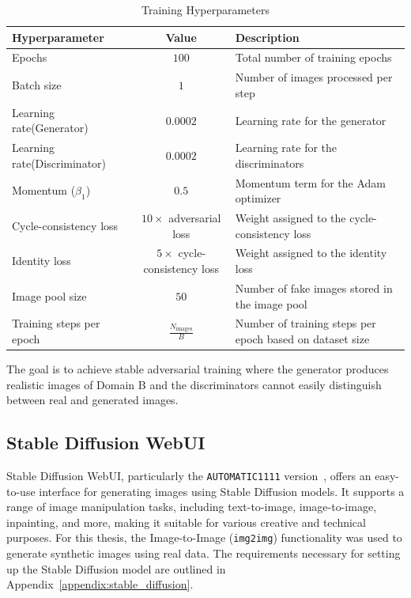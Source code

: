 \documentclass[12pt,DIV14,BCOR12mm,a4paper,footinclude=false,headinclude,parskip=half-,twoside,openright,cleardoublepage=empty,toc=index,bibliography=totoc,listof=totoc]{scrreprt}
\numberwithin{equation}{chapter}
\begin{document}
\begin{table}
    \centering
    \caption{Training Hyperparameters}
    \label{tab:hyperparameters}
    \begin{tabularx}{\textwidth}{XcX} %
        \toprule
        \textbf{Hyperparameter} & \textbf{Value} & \textbf{Description} \\ 
        \midrule
        Epochs & \( 100 \) & Total number of training epochs \\ 
        Batch size & \( 1 \) & Number of images processed per step \\
        Learning rate(Generator) & \( 0.0002 \) & Learning rate for the generator \\
        Learning rate(Discriminator) & \( 0.0002 \) & Learning rate for the discriminators \\
        Momentum (\( \beta_1 \)) & \( 0.5 \) & Momentum term for the Adam optimizer \\
        Cycle-consistency loss & \( 10 \times \) adversarial loss & Weight assigned to the cycle-consistency loss \\
        Identity loss & \( 5 \times \) cycle-consistency loss & Weight assigned to the identity loss \\
        Image pool size & \( 50 \) & Number of fake images stored in the image pool \\
        Training steps per epoch & \( \frac{N_{\text{images}}}{B} \) & Number of training steps per epoch based on dataset size \\ 
        \bottomrule
    \end{tabularx}
\end{table}

The goal is to achieve stable adversarial training where the generator produces realistic images of Domain B and the discriminators cannot easily distinguish between real and generated images.

\subsection{Stable Diffusion WebUI}
\label{sec:stable_diffusion}

Stable Diffusion WebUI, particularly the \texttt{AUTOMATIC1111} version~\cite{AUTOMATIC1111}, offers an easy-to-use interface for generating images using Stable Diffusion models. It supports a range of image manipulation tasks, including text-to-image, image-to-image, inpainting, and more, making it suitable for various creative and technical purposes. For this thesis, the Image-to-Image (\texttt{img2img}) functionality was used to generate synthetic images using real data. The requirements necessary for setting up the Stable Diffusion model are outlined in Appendix~\ref{appendix:stable_diffusion}.
\end{document}
